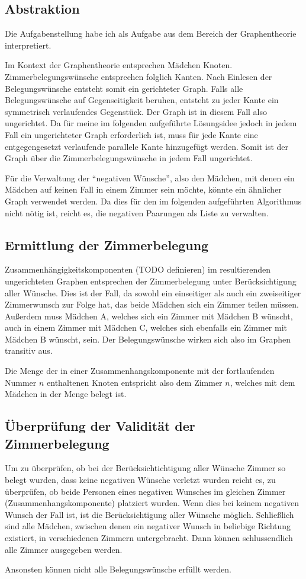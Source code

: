 \subsection{Abstraktion}
Die Aufgabenstellung habe ich als Aufgabe aus dem Bereich der Graphentheorie interpretiert.

Im Kontext der Graphentheorie entsprechen Mädchen Knoten. Zimmerbelegungswünsche entsprechen folglich Kanten.
Nach Einlesen der Belegungswünsche entsteht somit ein gerichteter Graph. Falls alle Belegungswünsche auf Gegenseitigkeit beruhen, entsteht zu jeder Kante ein symmetrisch verlaufendes Gegenstück.
Der Graph ist in diesem Fall also  ungerichtet.
Da für meine im folgenden aufgeführte Lösungsidee jedoch in jedem Fall ein ungerichteter Graph erforderlich ist, muss für jede Kante eine entgegengesetzt verlaufende parallele Kante hinzugefügt werden. Somit ist der Graph über die Zimmerbelegungswünsche in jedem Fall ungerichtet.

Für die Verwaltung der "`negativen Wünsche"', also den Mädchen, mit denen ein Mädchen auf keinen Fall in einem Zimmer sein möchte, könnte ein ähnlicher Graph verwendet werden.
Da dies für den im folgenden aufgeführten Algorithmus nicht nötig ist, reicht es, die negativen Paarungen als Liste zu verwalten.

\subsection{Ermittlung der Zimmerbelegung}
Zusammenhängigkeitskomponenten (TODO definieren) im resultierenden ungerichteten Graphen entsprechen der Zimmerbelegung unter Berücksichtigung aller Wünsche.
Dies ist der Fall, da sowohl ein einseitiger als auch ein zweiseitiger Zimmerwunsch zur Folge hat, das beide Mädchen sich ein Zimmer teilen müssen.
Außerdem muss Mädchen A, welches sich ein Zimmer mit Mädchen B wünscht, auch in einem Zimmer mit Mädchen C, welches sich ebenfalls ein Zimmer mit Mädchen B wünscht, sein. Der Belegungswünsche wirken sich also im Graphen transitiv aus.

Die Menge der in einer Zusammenhangskomponente mit der fortlaufenden Nummer \(n\) enthaltenen Knoten entspricht also dem Zimmer \(n\), welches mit dem Mädchen in der Menge belegt ist.

\subsection{Überprüfung der Validität der Zimmerbelegung}
Um zu überprüfen, ob bei der Berücksichtichtigung aller Wünsche Zimmer so belegt wurden, dass keine negativen Wünsche verletzt wurden reicht es, zu überprüfen, ob beide Personen eines negativen Wunsches im gleichen Zimmer (Zusammenhangskomponente) platziert wurden.
Wenn dies bei keinem negativen Wunsch der Fall ist, ist die Berücksichtigung aller Wünsche möglich.
Schließlich sind alle Mädchen, zwischen denen ein negativer Wunsch in beliebige Richtung existiert, in verschiedenen Zimmern untergebracht. Dann können schlussendlich alle Zimmer ausgegeben werden.

Ansonsten können nicht alle Belegungswünsche erfüllt werden.
